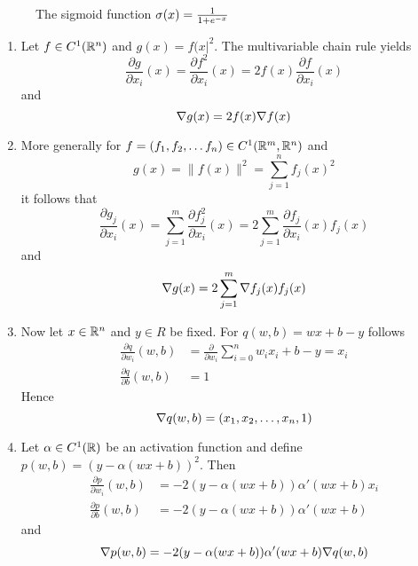 \begin{figure}[H]
    \centering
    \plotsigmoid{}
    \caption{The sigmoid function \( \sigma(x) = \frac{1}{1 + e^{-x}} \)}\label{fig:sigmoid}
\end{figure}
\bigskip

\begin{remarks}
    \hfill
    \begin{enumerate}
        \item Let \( f \in C^1(\mathbb{R}^n) \) and \( g(x) = f(x|^2 \). The multivariable  chain rule yields
              \[
                  \frac{\partial g}{\partial x_i}(x)
                  = \frac{\partial f^2}{\partial x_i}(x)
                  = 2 f(x) \frac{\partial f}{\partial x_i}(x)
              \]
              and
              \[
                  \nabla g(x) = 2 f(x) \nabla f(x)
              \]
        \item More generally for \( f = (f_1, f_2, \dots f_n)\in C^1(\mathbb{R}^m,\mathbb{R}^n) \) and
              \[
                  g(x) = \|f(x)\|^2 = \sum_{j = 1}^n {f_j(x)}^2
              \]
              it follows that
              \[
                  \frac{\partial g_j}{\partial x_i}(x)
                  = \sum_{j = 1}^m \frac{\partial f_j^2}{\partial x_i}(x)
                  = 2 \sum_{j = 1}^m \frac{\partial f_j}{\partial x_i}(x) f_j(x)
              \]
              and
              \[
                  \nabla g(x) = 2 \sum_{j = 1}^m \nabla f_j(x) f_j(x)
              \]
        \item Now let \( x \in \mathbb{R}^n \) and \( y \in R \) be fixed. For \( q(w, b) = wx + b - y \) follows
              \[
                  \begin{split}
                      \frac{\partial q}{\partial w_i}(w, b) &=
                      \frac{\partial}{\partial w_i} \sum_{i = 0}^n w_i x_i + b - y = x_i \\
                      \frac{\partial q}{\partial b}(w, b) &= 1
                  \end{split}
              \]
              Hence
              \[
                  \nabla q(w, b) = (x_1, x_2, \dots, x_n, 1)
              \]
        \item Let \( \alpha \in C^1(\mathbb{R}) \) be an activation function and define
              \( p(w,b) = (y - \alpha(wx + b))^2 \).
              Then
              \[
                  \begin{split}
                      \frac{\partial p}{\partial w_i}(w, b) &= -2 (y - \alpha(wx + b)) \alpha'(wx + b) x_i  \\
                      \frac{\partial p}{\partial b}(w, b) &= -2 (y - \alpha(wx + b)) \alpha'(wx + b)
                  \end{split}
              \]
              and
              \[
                  \nabla p(w, b) = -2 (y - \alpha(wx + b)) \alpha'(wx + b)\nabla q(w, b)
              \]
    \end{enumerate}
\end{remarks}
\bigskip


